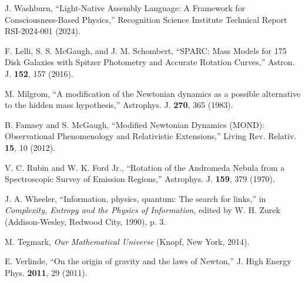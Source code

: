 \documentclass[10pt,a4paper]{article}
\begin{document}
\begin{thebibliography}{99}

 J. Washburn, ``Light-Native Assembly Language: A Framework for Consciousness-Based Physics,'' Recognition Science Institute Technical Report RSI-2024-001 (2024).

 F. Lelli, S. S. McGaugh, and J. M. Schombert, ``SPARC: Mass Models for 175 Disk Galaxies with Spitzer Photometry and Accurate Rotation Curves,'' Astron. J. \textbf{152}, 157 (2016).

 M. Milgrom, ``A modification of the Newtonian dynamics as a possible alternative to the hidden mass hypothesis,'' Astrophys. J. \textbf{270}, 365 (1983).

 B. Famaey and S. McGaugh, ``Modified Newtonian Dynamics (MOND): Observational Phenomenology and Relativistic Extensions,'' Living Rev. Relativ. \textbf{15}, 10 (2012).

 V. C. Rubin and W. K. Ford Jr., ``Rotation of the Andromeda Nebula from a Spectroscopic Survey of Emission Regions,'' Astrophys. J. \textbf{159}, 379 (1970).

 J. A. Wheeler, ``Information, physics, quantum: The search for links,'' in \emph{Complexity, Entropy and the Physics of Information}, edited by W. H. Zurek (Addison-Wesley, Redwood City, 1990), p. 3.

 M. Tegmark, \emph{Our Mathematical Universe} (Knopf, New York, 2014).

 E. Verlinde, ``On the origin of gravity and the laws of Newton,'' J. High Energy Phys. \textbf{2011}, 29 (2011).

\end{thebibliography}
\end{document}
